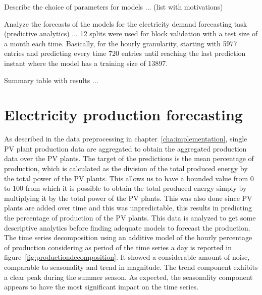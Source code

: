 Describe the choice of parameters for models ... (list with motivations)

Analyze the forecasts of the models for the electricity demand forecasting task (predictive analytics) ...
12 splits were used for block validation with a test size of a month each time.
Basically, for the hourly granularity, starting with 5977 entries and predicting every time 720 entries until reaching the last prediction instant where the model has a training size of 13897.

Summary table with results ...


\section{Electricity production forecasting}
\label{sec:productionval}
\vspace{0.2 cm}

As described in the data preprocessing in chapter~\ref{cha:implementation}, single PV plant production data are aggregated to obtain the aggregated production data over the PV plants.
The target of the predictions is the mean percentage of production, which is calculated as the division of the total produced energy by the total power of the PV plants.
This allows us to have a bounded value from 0 to 100 from which it is possible to obtain the total produced energy simply by multiplying it by the total power of the PV plants.
This was also done since PV plants are added over time and this was unpredictable, this results in predicting the percentage of production of the PV plants.
This data is analyzed to get some descriptive analytics before finding adequate models to forecast the production.
The time series decomposition using an additive model of the hourly percentage of production considering as period of the time series a day is reported in figure~\ref{fig:productiondecomposition}.
It showed a considerable amount of noise, comparable to seasonality and trend in magnitude.
The trend component exhibits a clear peak during the summer season.
As expected, the seasonality component appears to have the most significant impact on the time series.

